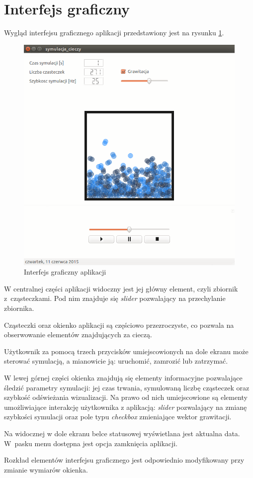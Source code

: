 
\section{Interfejs graficzny}
Wygląd interfejsu graficznego aplikacji przedstawiony jest na rysunku \ref{fig:gui}.

\begin{figure}
 \begin{center} 
  \includegraphics[width=\textwidth]{./rysunki/gui} 
 \end{center}
 \caption{Interfejs graficzny aplikacji}
 \label{fig:gui} 
\end{figure}

W centralnej części aplikacji widoczny jest jej główny element, czyli zbiornik z~cząsteczkami. Pod nim znajduje się \textit{slider} pozwalający na przechylanie zbiornika.

Cząsteczki oraz okienko aplikacji są częściowo przezroczyste, co pozwala na obserwowanie elementów znajdujących za cieczą.

Użytkownik za pomocą trzech przycisków umiejscowionych na dole ekranu może sterować symulacją, a mianowicie ją: uruchomić, zamrozić lub zatrzymać.  

W lewej górnej części okienka znajdują się elementy informacyjne pozwalające śledzić parametry symulacji: jej czas trwania, symulowaną liczbę cząsteczek oraz szybkość odświeżania wizualizacji. Na prawo od nich umiejscowione są elementy umożliwiające interakcję użytkownika z aplikacją: \textit{slider} pozwalający na zmianę szybkości symulacji oraz pole typu \textit{checkbox} zmieniające wektor grawitacji.

Na widocznej w dole ekranu belce statusowej wyświetlana jest aktualna data. W~pasku menu dostępna jest opcja zamknięcia aplikacji.

Rozkład elementów interfejsu graficznego jest odpowiednio modyfikowany przy zmianie wymiarów okienka.